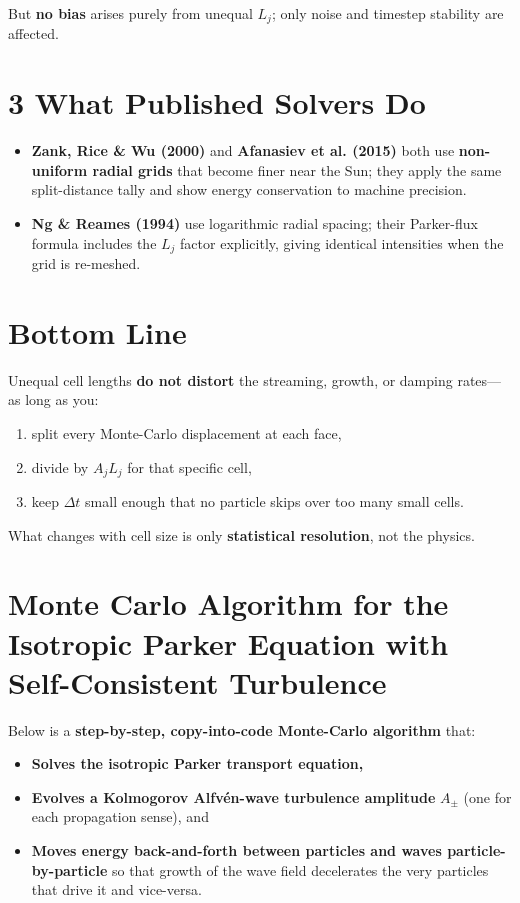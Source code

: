 \bigskip

But \textbf{no bias} arises purely from unequal $L_j$; only noise and timestep stability are affected.

\bigskip

\section*{3 \quad What Published Solvers Do}

\begin{itemize}
  \item \textbf{Zank, Rice \& Wu (2000)} and \textbf{Afanasiev et al. (2015)} both use \textbf{non-uniform radial grids} that become finer near the Sun; they apply the same split-distance tally and show energy conservation to machine precision.
  \item \textbf{Ng \& Reames (1994)} use logarithmic radial spacing; their Parker-flux formula includes the $L_j$ factor explicitly, giving identical intensities when the grid is re-meshed.
\end{itemize}

\bigskip

\section*{Bottom Line}

Unequal cell lengths \textbf{do not distort} the streaming, growth, or damping rates—as long as you:

\begin{enumerate}
  \item split every Monte-Carlo displacement at each face,
  \item divide by $A_jL_j$ for that specific cell,
  \item keep $\Delta t$ small enough that no particle skips over too many small cells.
\end{enumerate}

What changes with cell size is only \textbf{statistical resolution}, not the physics.



\section{Monte Carlo Algorithm for the Isotropic Parker Equation with Self-Consistent Turbulence}


Below is a \textbf{step-by-step, copy-into-code Monte-Carlo algorithm} that:
\begin{itemize}
    \item \textbf{Solves the isotropic Parker transport equation,}
    \item \textbf{Evolves a Kolmogorov Alfvén-wave turbulence amplitude} $A_\pm$ (one for each propagation sense), and
    \item \textbf{Moves energy back-and-forth between particles and waves particle-by-particle} so that growth of the wave field decelerates the very particles that drive it and vice-versa.
\end{itemize}

